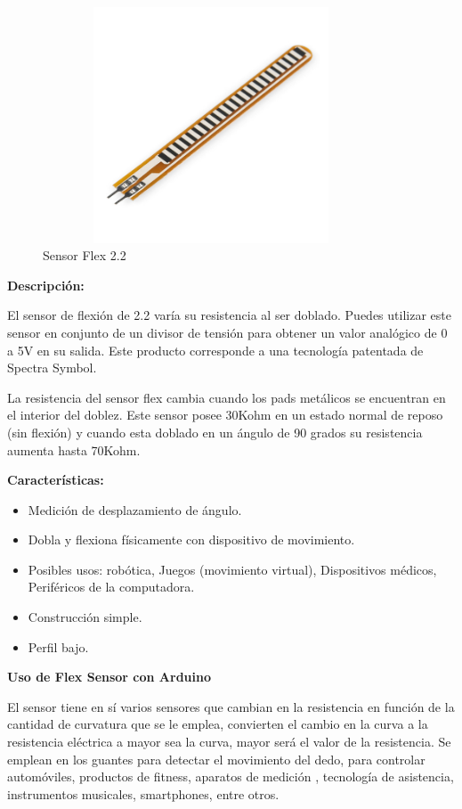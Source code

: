 \documentclass[12pt]{report}%
\begin{document}
\begin{figure}[h!]
\centering
	 \includegraphics[width=10cm, height=7cm]{sensorf.jpg}
	 \caption[Sensor Flex 2.2]{Sensor Flex 2.2}%
	 	 \label{fig:sensorFlex}
\end{figure}

\textbf{Descripción:}

El sensor de flexión de 2.2 varía su resistencia al ser doblado. Puedes utilizar este sensor en conjunto de un divisor de tensión para obtener un valor analógico de 0 a 5V en su salida. Este producto corresponde a una tecnología patentada de Spectra Symbol.

La resistencia del sensor flex cambia cuando los pads metálicos se encuentran en el interior del doblez. Este sensor posee 30Kohm en un estado normal de reposo (sin flexión) y cuando esta doblado en un ángulo de 90 grados su resistencia aumenta hasta 70Kohm.

\textbf{Características:}
\begin{itemize}
\item Medición de desplazamiento de ángulo.
\item Dobla y flexiona físicamente con dispositivo de movimiento.
\item Posibles usos: robótica, Juegos (movimiento virtual), Dispositivos médicos, Periféricos de la computadora.
\item Construcción simple.
\item Perfil bajo.
\end{itemize}

\textbf{Uso de Flex Sensor con Arduino}

El sensor tiene en sí varios sensores que cambian en la resistencia en función de la cantidad de curvatura que se le emplea, convierten el cambio en la curva a la resistencia eléctrica a mayor sea la curva, mayor será el valor de la resistencia. Se emplean en los guantes para detectar el movimiento del dedo, para controlar automóviles, productos de fitness, aparatos de medición , tecnología de asistencia, instrumentos musicales, smartphones, entre otros.
\end{document}
